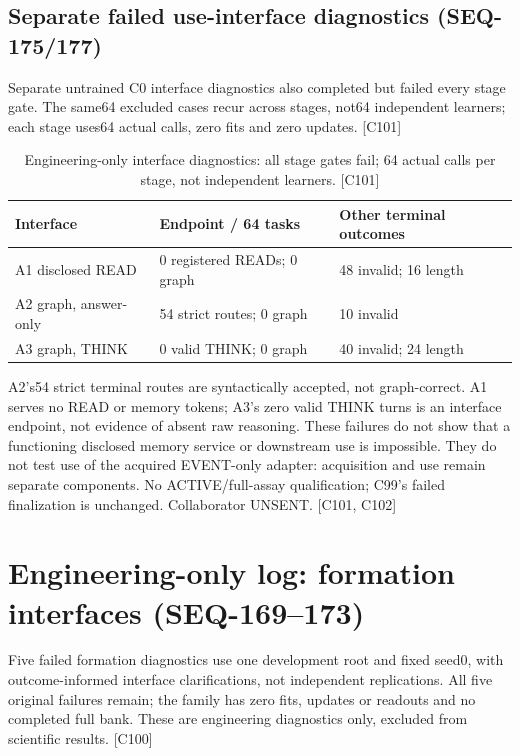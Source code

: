 \documentclass{article}
\begin{document}
\subsection{Separate failed use-interface diagnostics (SEQ-175/177)}
Separate untrained C0 interface diagnostics also completed but failed every
stage gate. The same64 excluded cases recur across stages, not64 independent
learners; each stage uses64 actual calls, zero fits and zero updates. [C101]

\begin{table}[ht]
\centering\small
\begin{tabular}{lll}
\toprule
Interface & Endpoint / 64 tasks & Other terminal outcomes \\
\midrule
A1 disclosed READ & 0 registered READs; 0 graph & 48 invalid; 16 length \\
A2 graph, answer-only & 54 strict routes; 0 graph & 10 invalid \\
A3 graph, THINK & 0 valid THINK; 0 graph & 40 invalid; 24 length \\
\bottomrule
\end{tabular}
\caption{Engineering-only interface diagnostics: all stage gates fail;
64 actual calls per stage, not independent learners. [C101]}
\end{table}

A2's54 strict terminal routes are syntactically accepted, not graph-correct.
A1 serves no READ or memory tokens; A3's zero valid THINK turns is an interface
endpoint, not evidence of absent raw reasoning. These failures do not show
that a functioning disclosed memory service or downstream use is impossible.
They do not test use of the acquired EVENT-only adapter: acquisition and use
remain separate components. No ACTIVE/full-assay qualification; C99's failed
finalization is unchanged. Collaborator UNSENT. [C101, C102]

\section{Engineering-only log: formation interfaces (SEQ-169--173)}
Five failed formation diagnostics use one development root and fixed seed0,
with outcome-informed interface clarifications, not independent replications.
All five original failures remain; the family has zero fits, updates or
readouts and no completed full bank. These are engineering diagnostics only,
excluded from scientific results. [C100]
\end{document}
